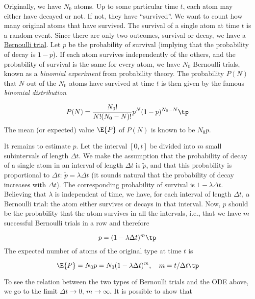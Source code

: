 \documentclass[graybox,sectrefs,envcountresetchap,open=right,final]{svmonodo}
\begin{document}
Originally, we have $N_0$ atoms. Up to some particular time $t$, each
atom may either have decayed or not. If not, they have ``survived''.
We want to count how many original
atoms that have survived.
The survival of a single atom at time $t$ is a random event. Since there
are only two outcomes, survival or decay, we have a
\href{{http://en.wikipedia.org/wiki/Bernoulli_trial}}{Bernoulli trial}.
Let $p$ be the
probability of survival (implying that the probability of decay
is $1-p$). If each atom survives independently of
the others, and the probability of survival is the same for every
atom, we have $N_0$ Bernoulli trials, known as
a \emph{binomial experiment} from probability theory.
The probability $P(N)$ that $N$ out
of the $N_0$ atoms have survived at time $t$ is then given by the
famous \emph{binomial distribution}

\[ P(N) = \frac{N_0!}{N! (N_0-N)!}p^N (1-p)^{N_0-N}\tp \]
The mean (or expected) value $\E{P}$ of $P(N)$ is known to be $N_0p$.

It remains to estimate $p$. Let the interval $[0,t]$ be divided into $m$
small subintervals of length $\Delta t$. We make the assumption that
the probability of decay of a single atom in an interval of length $\Delta t$
is $\tilde p$, and that this probability is proportional to $\Delta t$:
$\tilde p = \lambda\Delta t$ (it sounds natural that the probability
of decay increases with $\Delta t$). The corresponding probability of survival
is $1-\lambda\Delta t$. Believing that $\lambda$ is independent
of time, we have, for each interval of length $\Delta t$,
a Bernoulli trial: the atom either survives or
decays in that interval. Now, $p$ should be the probability that the atom
survives in all the intervals, i.e., that we have $m$ successful
Bernoulli trials in a row and therefore

\[ p = (1-\lambda\Delta t)^m\tp\]
The expected number of atoms of the original type at time $t$ is

\begin{equation}
\E{P} = N_0p = N_0(1-\lambda\Delta t)^m,\quad m=t/\Delta t\tp
\end{equation}

To see the relation between the two types of Bernoulli trials and the
ODE above, we go to the limit $\Delta t\rightarrow 0$, $m\rightarrow\infty$.
It is possible to show that
\end{document}
